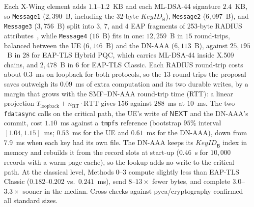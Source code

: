 \documentclass[symmetry,article,submit,moreauthors]{Definitions/mdpi}
\begin{document}
 Each X-Wing element adds $1.1$--$1.2$~KB and each ML-DSA-44 signature $2.4$~KB, so \texttt{Message1} ($2{,}390$~B, including the $32$-byte $\mathit{KeyID}_{\mathsf{B}}$), \texttt{Message2} ($6{,}097$~B), and \texttt{Message3} ($3{,}756$~B) split into $3$, $7$, and $4$ EAP fragments of 253-byte RADIUS attributes~\cite{RFC3579}, while \texttt{Message4} ($16$~B) fits in one: $12{,}259$~B in $15$ round-trips, balanced between the UE ($6{,}146$~B) and the DN-AAA ($6{,}113$~B), against $25{,}195$~B in $28$ for EAP-TLS Hybrid PQC, which carries ML-DSA-44 inside X.509 chains, and $2{,}478$~B in $6$ for EAP-TLS Classic. Each RADIUS round-trip costs about $0.3$~ms on loopback for both protocols, so the $13$ round-trips the proposal saves outweigh its $0.09$~ms of extra computation and its two durable writes, by a margin that grows with the SMF--DN-AAA round-trip time (RTT): a linear projection $T_{\mathrm{loopback}} + n_{\mathrm{RT}}\cdot\mathrm{RTT}$ gives $156$ against $288$~ms at $10$~ms. The two \texttt{fdatasync} calls on the critical path, the UE's write of $\mathsf{NEXT}$ and the DN-AAA's commit, cost $1.10$~ms against a \texttt{tmpfs} reference (bootstrap $95\%$ interval $[1.04, 1.15]$~ms; $0.53$~ms for the UE and $0.61$~ms for the DN-AAA), down from $7.9$~ms when each key had its own file. The DN-AAA keeps its $\mathit{KeyID}_{\mathsf{B}}$ index in memory and rebuilds it from the record slots at start-up ($0.46$~s for $10{,}000$ records with a warm page cache), so the lookup adds no write to the critical path. At the classical level, Methods 0--3 compute slightly less than EAP-TLS Classic ($0.182$--$0.202$ vs.\ $0.241$~ms), send $8$--$13\times$ fewer bytes, and complete $3.0$--$3.3\times$ sooner in the median. Cross-checks against pyca/cryptography confirmed all standard sizes.
\end{document}
